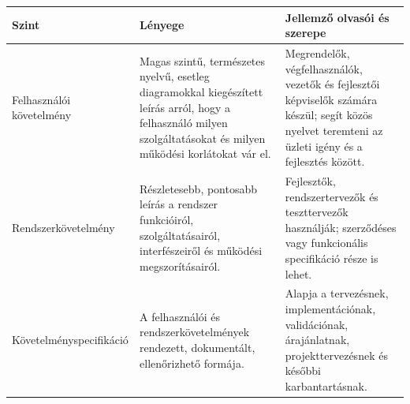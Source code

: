 \begin{tabularx}{\textwidth}{L{42mm}X X}
\toprule
\textbf{Szint} & \textbf{Lényege} & \textbf{Jellemző olvasói és szerepe} \\
\midrule
Felhasználói követelmény & Magas szintű, természetes nyelvű, esetleg diagramokkal kiegészített leírás arról, hogy a felhasználó milyen szolgáltatásokat és milyen működési korlátokat vár el. & Megrendelők, végfelhasználók, vezetők és fejlesztői képviselők számára készül; segít közös nyelvet teremteni az üzleti igény és a fejlesztés között. \\
Rendszerkövetelmény & Részletesebb, pontosabb leírás a rendszer funkcióiról, szolgáltatásairól, interfészeiről és működési megszorításairól. & Fejlesztők, rendszertervezők és teszttervezők használják; szerződéses vagy funkcionális specifikáció része is lehet. \\
Követelményspecifikáció & A felhasználói és rendszerkövetelmények rendezett, dokumentált, ellenőrizhető formája. & Alapja a tervezésnek, implementációnak, validációnak, árajánlatnak, projekttervezésnek és későbbi karbantartásnak. \\
\bottomrule
\end{tabularx}
